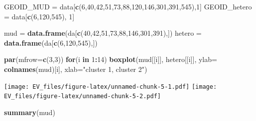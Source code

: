 \documentclass[]{article}
\newenvironment{Shaded}{\begin{snugshade}}{\end{snugshade}}
\newcommand{\KeywordTok}[1]{\textcolor[rgb]{0.13,0.29,0.53}{\textbf{#1}}}
\newcommand{\DataTypeTok}[1]{\textcolor[rgb]{0.13,0.29,0.53}{#1}}
\newcommand{\DecValTok}[1]{\textcolor[rgb]{0.00,0.00,0.81}{#1}}
\newcommand{\StringTok}[1]{\textcolor[rgb]{0.31,0.60,0.02}{#1}}
\newcommand{\ControlFlowTok}[1]{\textcolor[rgb]{0.13,0.29,0.53}{\textbf{#1}}}
\newcommand{\OperatorTok}[1]{\textcolor[rgb]{0.81,0.36,0.00}{\textbf{#1}}}
\newcommand{\NormalTok}[1]{#1}
\begin{document}
\begin{Shaded}
\begin{Highlighting}[]
\NormalTok{GEOID_MUD =}\StringTok{ }\NormalTok{data[}\KeywordTok{c}\NormalTok{(}\DecValTok{6}\NormalTok{,}\DecValTok{40}\NormalTok{,}\DecValTok{42}\NormalTok{,}\DecValTok{51}\NormalTok{,}\DecValTok{73}\NormalTok{,}\DecValTok{88}\NormalTok{,}\DecValTok{120}\NormalTok{,}\DecValTok{146}\NormalTok{,}\DecValTok{301}\NormalTok{,}\DecValTok{391}\NormalTok{,}\DecValTok{545}\NormalTok{),}\DecValTok{1}\NormalTok{]}
\NormalTok{GEOID_hetero =}\StringTok{ }\NormalTok{data[}\KeywordTok{c}\NormalTok{(}\DecValTok{6}\NormalTok{,}\DecValTok{120}\NormalTok{,}\DecValTok{545}\NormalTok{), }\DecValTok{1}\NormalTok{]}

\NormalTok{mud =}\StringTok{ }\KeywordTok{data.frame}\NormalTok{(da[}\KeywordTok{c}\NormalTok{(}\DecValTok{40}\NormalTok{,}\DecValTok{42}\NormalTok{,}\DecValTok{51}\NormalTok{,}\DecValTok{73}\NormalTok{,}\DecValTok{88}\NormalTok{,}\DecValTok{146}\NormalTok{,}\DecValTok{301}\NormalTok{,}\DecValTok{391}\NormalTok{),])}
\NormalTok{hetero =}\StringTok{ }\KeywordTok{data.frame}\NormalTok{(da[}\KeywordTok{c}\NormalTok{(}\DecValTok{6}\NormalTok{,}\DecValTok{120}\NormalTok{,}\DecValTok{545}\NormalTok{),])}

\KeywordTok{par}\NormalTok{(}\DataTypeTok{mfrow=}\KeywordTok{c}\NormalTok{(}\DecValTok{3}\NormalTok{,}\DecValTok{3}\NormalTok{))}
\ControlFlowTok{for}\NormalTok{(i }\ControlFlowTok{in} \DecValTok{1}\OperatorTok{:}\DecValTok{14}\NormalTok{) }\KeywordTok{boxplot}\NormalTok{(mud[[i]], hetero[[i]], }\DataTypeTok{ylab=} \KeywordTok{colnames}\NormalTok{(mud)[i], }\DataTypeTok{xlab=}\StringTok{"cluster 1, cluster 2"}\NormalTok{)}
\end{Highlighting}
\end{Shaded}

\texttt{[image: EV\_files/figure-latex/unnamed-chunk-5-1.pdf]}
\texttt{[image: EV\_files/figure-latex/unnamed-chunk-5-2.pdf]}

\begin{Shaded}
\begin{Highlighting}[]
\KeywordTok{summary}\NormalTok{(mud)}
\end{Highlighting}
\end{Shaded}
\end{document}
